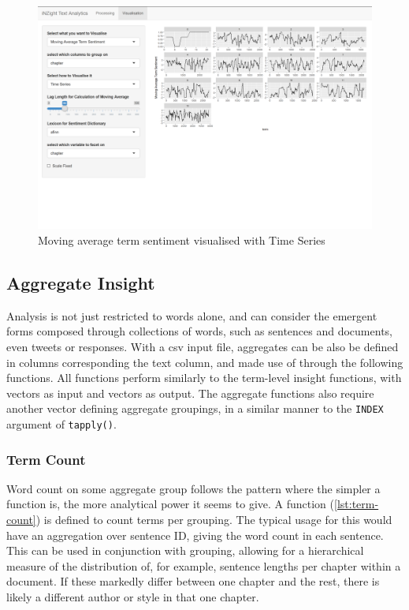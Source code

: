 \message{ !name(jason-cairns-dissertation.tex)}\documentclass[11pt, a4paper, titlepage]{report}
\begin{document}
\begin{figure}
\centering
\includegraphics[scale=0.35]{visualisation-ma-overview.png}
\caption{Moving average term sentiment visualised with Time Series\label{fig:visualisation-ma-overview}}
\end{figure}

\subsection{Aggregate Insight}\label{sec:aggregate-insight}

Analysis is not just restricted to words alone, and can consider the
emergent forms composed through collections of words, such as
sentences and documents, even tweets or responses. With a csv input
file, aggregates can be also be defined in columns corresponding the
text column, and made use of through the following functions. All
functions perform similarly to the term-level insight functions, with
vectors as input and vectors as output. The aggregate functions also
require another vector defining aggregate groupings, in a similar
manner to the \texttt{INDEX} argument of
\texttt{tapply()}.

\subsubsection{Term Count}\label{sec:term-count}

Word count on some aggregate group follows the pattern where the
simpler a function is, the more analytical power it seems to give. A
function (\cref{lst:term-count}) is defined to count terms per
grouping. The typical usage for this would have an aggregation over
sentence ID, giving the word count in each sentence. This can be used
in conjunction with grouping, allowing for a hierarchical measure of
the distribution of, for example, sentence lengths per chapter within
a document. If these markedly differ between one chapter and the rest,
there is likely a different author or style in that one chapter.
\end{document}
